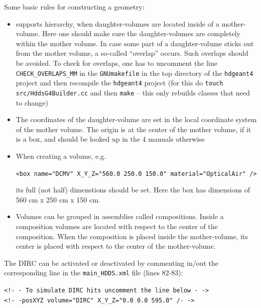 \vspace{0.5cm}
Some basic rules for constructing a \geant geometry:
\begin{itemize}
\item \geant supports hierarchy, when daughter-volumes are located inside of a mother-volume.  Here one should make sure the daughter-volumes are completely within the mother volume. In case some part of a daughter-volume sticks out from the mother volume, a so-called ``overlap'' occurs. Such overlaps should be avoided. To check for overlaps, one has to uncomment the line \texttt{CHECK{\_}OVERLAPS{\_}MM} in the \texttt{GNUmakefile} in the top directory of the \texttt{hdgeant4} project and then recompile the \texttt{hdgeant4} project (for this do \texttt{touch src/HddsG4Builder.cc} and then \texttt{make} -- this only rebuilds classes that need to change)
\item The coordinates of the daughter-volume are set in the local coordinate system of the mother volume. The origin is at the center of the mother volume, if it is a box, and should be looked up in the {\geant}4 manuals otherwise
\item When creating a volume, e.g.
\begin{center}
 \texttt{<box name="DCMV" X{\_}Y{\_}Z="560.0 250.0 150.0" material="OpticalAir" />} 
\end{center}
\noindent its full (not half) dimenstions should be set. Here the box has dimensions of 560 cm x 250 cm x 150 cm.
\item Volumes can be grouped in assemblies called compositions. Inside a composition volumes are located with respect to the center of the composition. When the composition is placed inside the mother-volume, its center is placed with respect to the center of the mother-volume.
\end{itemize}

The DIRC can be activated or deactivated by commenting in/out the corresponding line in the \texttt{main{\_}HDDS.xml} file (lines 82-83): 

\vspace{0.5cm}
\begin{center}
 \texttt{<!- - To simulate DIRC hits uncomment the line below - -> \\
    <!- -posXYZ volume="DIRC" X{\_}Y{\_}Z="0.0 0.0 595.0" /- ->} 
\end{center}
\label{eq:line}
\vspace{0.5cm}

